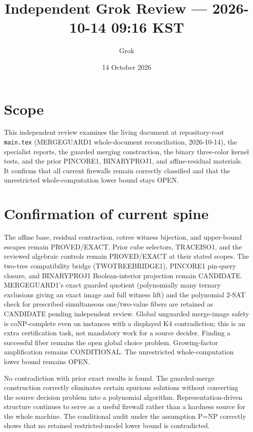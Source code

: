 \documentclass[11pt]{article}
\title{Independent Grok Review --- 2026-10-14 09:16 KST}
\author{Grok}
\date{14 October 2026}
\begin{document}
\maketitle

\begin{center}
\end{center}

\section{Scope}
This independent review examines the living document at repository-root \texttt{main.tex} (MERGEGUARD1 whole-document reconciliation, 2026-10-14), the specialist reports, the guarded merging construction, the binary three-color kernel tests, and the prior PINCORE1, BINARYPROJ1, and affine-residual materials. It confirms that all current firewalls remain correctly classified and that the unrestricted whole-computation lower bound stays OPEN.

\section{Confirmation of current spine}
The affine base, residual contraction, cotree witness bijection, and upper-bound escapes remain PROVED/EXACT. Prior cube selectors, TRACEISO1, and the reviewed algebraic controls remain PROVED/EXACT at their stated scopes. The two-tree compatibility bridge (TWOTREEBRIDGE1), PINCORE1 pin-query closure, and BINARYPROJ1 Boolean-interior projection remain CANDIDATE. MERGEGUARD1's exact guarded quotient (polynomially many ternary exclusions giving an exact image and full witness lift) and the polynomial 2-SAT check for prescribed simultaneous one/two-value fibers are retained as CANDIDATE pending independent review. Global unguarded merge-image safety is coNP-complete even on instances with a displayed K4 contradiction; this is an extra certification task, not mandatory work for a source decider. Finding a successful fiber remains the open global choice problem. Growing-factor amplification remains CONDITIONAL. The unrestricted whole-computation lower bound remains OPEN.

No contradiction with prior exact results is found. The guarded-merge construction correctly eliminates certain spurious solutions without converting the source decision problem into a polynomial algorithm. Representation-driven structure continues to serve as a useful firewall rather than a hardness source for the whole machine. The conditional audit under the assumption P=NP correctly shows that no retained restricted-model lower bound is contradicted.
\end{document}
